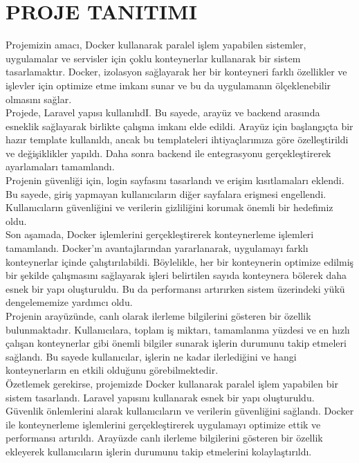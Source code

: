 \section{PROJE TANITIMI }
Projemizin amacı, Docker kullanarak paralel işlem yapabilen sistemler, uygulamalar ve servisler için çoklu konteynerlar kullanarak bir sistem tasarlamaktır. Docker, izolasyon sağlayarak her bir konteyneri farklı özellikler ve işlevler için optimize etme imkanı sunar ve bu da uygulamanın ölçeklenebilir olmasını sağlar.\\
Projede, Laravel yapısı kullanılıdI. Bu sayede, arayüz ve backend arasında esneklik sağlayarak birlikte çalışma imkanı elde edildi. Arayüz için başlangıçta bir hazır template kullanıldı, ancak bu templateleri ihtiyaçlarımıza göre özelleştirildi ve değişiklikler yapıldı. Daha sonra backend ile entegrasyonu gerçekleştirerek ayarlamaları tamamlandı.\\
Projenin güvenliği için, login sayfasını tasarlandı ve erişim kısıtlamaları eklendi. Bu sayede, giriş yapmayan kullanıcıların diğer sayfalara erişmesi engellendi. Kullanıcıların güvenliğini ve verilerin gizliliğini korumak önemli bir hedefimiz oldu.\\
Son aşamada, Docker işlemlerini gerçekleştirerek konteynerleme işlemleri tamamlandı. Docker'ın avantajlarından yararlanarak, uygulamayı farklı konteynerlar içinde çalıştırılabildi. Böylelikle, her bir konteynerin optimize edilmiş bir şekilde çalışmasını sağlayarak işleri belirtilen sayıda konteynera bölerek daha esnek bir yapı oluşturuldu. Bu da performansı artırırken sistem üzerindeki yükü dengelememize yardımcı oldu.\\
Projenin arayüzünde, canlı olarak ilerleme bilgilerini gösteren bir özellik bulunmaktadır. Kullanıcılara, toplam iş miktarı, tamamlanma yüzdesi ve en hızlı çalışan konteynerlar gibi önemli bilgiler sunarak işlerin durumunu takip etmeleri sağlandı. Bu sayede kullanıcılar, işlerin ne kadar ilerlediğini ve hangi konteynerların en etkili olduğunu görebilmektedir.\\
Özetlemek gerekirse, projemizde Docker kullanarak paralel işlem yapabilen bir sistem tasarlandı. Laravel  yapısını kullanarak esnek bir yapı oluşturuldu. Güvenlik önlemlerini alarak kullanıcıların ve verilerin güvenliğini sağlandı. Docker ile konteynerleme işlemlerini gerçekleştirerek uygulamayı optimize ettik ve performansı artırıldı. Arayüzde canlı ilerleme bilgilerini gösteren bir özellik ekleyerek kullanıcıların işlerin durumunu takip etmelerini kolaylaştırıldı.\\

